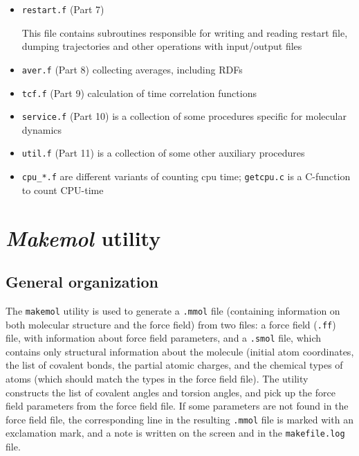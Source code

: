 \documentclass{article}
\begin{document}
\begin{itemize}
\item
\verb|restart.f| (Part 7) 

This file contains subroutines responsible for writing and
reading restart file, dumping trajectories and other operations
with input/output files

\item
\verb|aver.f| (Part 8)  collecting averages, including RDFs

\item
\verb|tcf.f| (Part 9)  calculation of time correlation functions

\item
\verb|service.f| (Part 10) is a collection of some procedures specific for 
molecular dynamics

\item
\verb|util.f| (Part 11) is a collection of some other auxiliary procedures


\item
\verb|cpu_*.f|  are different variants of counting cpu time;
\verb|getcpu.c| is a C-function to count CPU-time

		      
\end{itemize}

\section{{\em Makemol} utility}

\subsection{General organization}

The \verb|makemol| utility is used to generate a \verb|.mmol| file 
(containing information on both molecular structure and the force field)
from two files: a force field (\verb|.ff|) file, with information about 
force field parameters, and a \verb|.smol| file, which contains only 
structural information about the molecule (initial atom coordinates,
the list of covalent bonds, the partial atomic charges, and the chemical 
types of atoms (which should match the types in the force field file).
The utility constructs the list of covalent angles and torsion angles,
and pick up the force field parameters from the force field file. If some
parameters are not found in the force field file, the corresponding line
in the resulting \verb|.mmol| file is marked with an exclamation mark, 
and a note is written on the screen and in the \verb|makefile.log| file.
\end{document}
